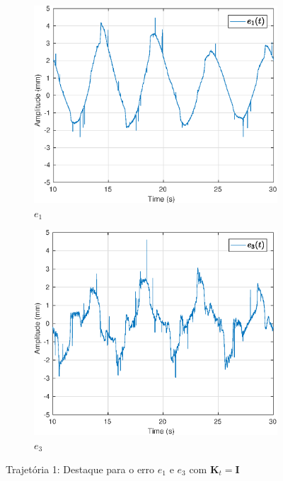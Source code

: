 \begin{figure}[H]
\centering
\begin{subfigure}{.5\textwidth}
  \centering
  \includegraphics[width=\linewidth]{./img/traj_1_k1/error0.eps}
  \caption{$e_1$}
  \label{fig:sub1}
\end{subfigure}%
\begin{subfigure}{.5\textwidth}
  \centering
  \includegraphics[width=\linewidth]{./img/traj_1_k1/error2.eps}
  \caption{$e_3$}
  \label{fig:sub2}
\end{subfigure}
\caption{Trajetória 1: Destaque para o erro $e_1$ e $e_3$ com $\bm{K}_t = \bm{I}$}
\label{fig:erro_traj}
\end{figure}

